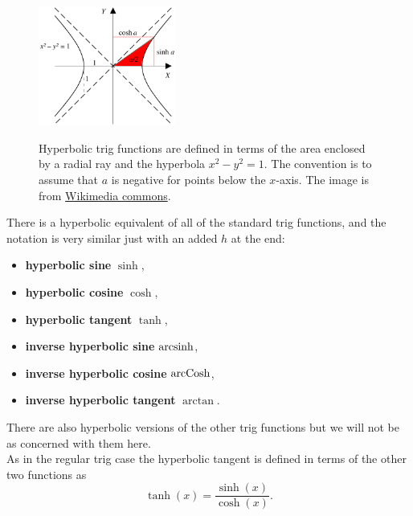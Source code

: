 \begin{figure}[ht]
    \centering
  \includegraphics[width=0.4\textwidth, alt ={Hyperbolic trig functions are related to the geometry of hyperbolas rather than circles.}]{figures/Hyperbolic_functions}
    \caption{Hyperbolic trig functions are defined in terms of  the area enclosed by a radial ray and the hyperbola $x^{2}-y^{2}=1$.  The convention is to assume that $a$ is negative for points below the $x$-axis. The image is from \href{https://commons.wikimedia.org/wiki/File:Hyperbolic_functions-2.svg}{Wikimedia commons}. }
\label{fig: hyperbolic functions}
\end{figure}


There is a hyperbolic equivalent of all of the standard trig functions, and the notation is very similar just with an added $h$ at the end:
\begin{itemize}
    \item \textbf{hyperbolic sine}  $\sinh$,
    \item \textbf{hyperbolic cosine} $\cosh$,
   \item \textbf{hyperbolic tangent} $\tanh$,
   \item \textbf{inverse hyperbolic sine} $\operatorname{arcsinh}$,
   \item \textbf{inverse hyperbolic cosine} $\operatorname{arcCosh}$,
   \item \textbf{inverse hyperbolic tangent} $\arctan$.
\end{itemize}
There are also hyperbolic versions of the other trig functions but we will not be as concerned with them here.\\

As in the regular trig case the hyperbolic tangent is defined in terms of the other two functions as
\begin{equation}
\tanh(x)=\frac{\sinh(x)}{\cosh(x)}.
\label{eq: hyperbolic tangent}
\end{equation}


